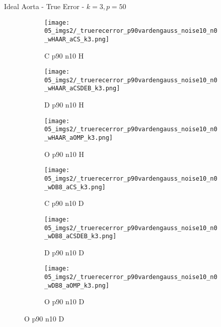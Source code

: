 \begin{frame}{Ideal Aorta - True Error - $k=3,p=50$}{}
\begin{figure}
\begin{subfigure}{0.13\textwidth}
\texttt{[image: 05\_imgs2/\_truerecerror\_p90vardengauss\_noise10\_n0\_wHAAR\_aCS\_k3.png]}
\caption*{\tiny C p90 n10 H}
\end{subfigure}
\begin{subfigure}{0.13\textwidth}
\texttt{[image: 05\_imgs2/\_truerecerror\_p90vardengauss\_noise10\_n0\_wHAAR\_aCSDEB\_k3.png]}
\caption*{\tiny D p90 n10 H}
\end{subfigure}
\begin{subfigure}{0.13\textwidth}
\texttt{[image: 05\_imgs2/\_truerecerror\_p90vardengauss\_noise10\_n0\_wHAAR\_aOMP\_k3.png]}
\caption*{\tiny O p90 n10 H}
\end{subfigure}
\begin{subfigure}{0.13\textwidth}
\texttt{[image: 05\_imgs2/\_truerecerror\_p90vardengauss\_noise10\_n0\_wDB8\_aCS\_k3.png]}
\caption*{\tiny C p90 n10 D}
\end{subfigure}
\begin{subfigure}{0.13\textwidth}
\texttt{[image: 05\_imgs2/\_truerecerror\_p90vardengauss\_noise10\_n0\_wDB8\_aCSDEB\_k3.png]}
\caption*{\tiny D p90 n10 D}
\end{subfigure}
\begin{subfigure}{0.13\textwidth}
\texttt{[image: 05\_imgs2/\_truerecerror\_p90vardengauss\_noise10\_n0\_wDB8\_aOMP\_k3.png]}
\caption*{\tiny O p90 n10 D}
\end{subfigure}

\vspace{5pt}


\end{figure}
\end{frame}
